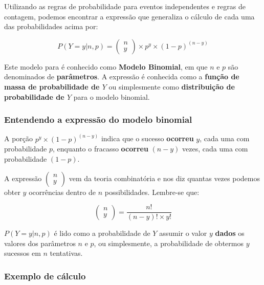 \documentclass[
]{book}
\begin{document}
Utilizando as regras de probabilidade para eventos independentes e regras de contagem, podemos encontrar a expressão que generaliza o cálculo de cada uma das probabilidades acima por:

\[P(Y = y|n,p) = \left (\begin{array}{c}
n \\
y
\end{array}\right) \times p^y \times (1-p)^{(n-y)}\]

Este modelo para é conhecido como \textbf{Modelo Binomial}, em que \(n\) e \(p\) são denominados de \textbf{parâmetros}. A expressão é conhecida como a \textbf{função de massa de probabilidade de \(Y\)} ou simplesmente como \textbf{distribuição de probabilidade de \(Y\)} para o modelo binomial.

\hypertarget{entendendo-a-expressuxe3o-do-modelo-binomial}{%
\subsubsection*{Entendendo a expressão do modelo binomial}\label{entendendo-a-expressuxe3o-do-modelo-binomial}}

A porção \(p^y \times (1-p)^{(n-y)}\) indica que o sucesso \textbf{ocorreu} \(y\), cada uma com probabilidade \(p\), enquanto o fracasso \textbf{ocorreu} \((n - y)\) vezes, cada uma com probabilidade \((1-p)\).

A expressão \(\left (\begin{array}{c} n \\ y \end{array}\right)\) vem da teoria combinatória e nos diz quantas vezes podemos obter \(y\) ocorrências dentro de \(n\) possibilidades. Lembre-se que:

\[\left (\begin{array}{c}
n \\
y
\end{array}\right) = \frac{n!}{(n-y)! \times y!}\]

\(P(Y = y|n,p)\) é lido como a probabilidade de \(Y\) assumir o valor \(y\) \textbf{dados} os valores dos parâmetros \(n\) e \(p\), ou simplesmente, a probabilidade de obtermos \(y\) sucessos em \(n\) tentativas.

\hypertarget{exemplo-de-cuxe1lculo}{%
\subsubsection{Exemplo de cálculo}\label{exemplo-de-cuxe1lculo}}
\end{document}
